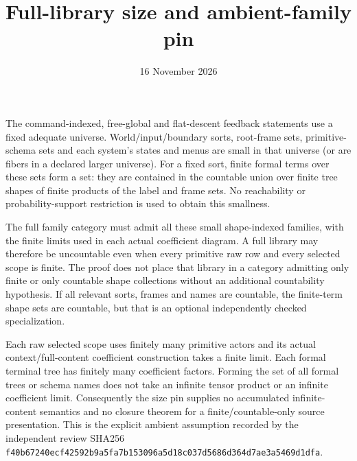 \documentclass{article}\usepackage{amsmath,amssymb}
\title{Full-library size and ambient-family pin}\date{16 November 2026}
\begin{document}
\maketitle
The command-indexed, free-global and flat-descent feedback statements use a fixed adequate universe. World/input/boundary sorts, root-frame sets, primitive-schema sets and each system's states and menus are small in that universe (or are fibers in a declared larger universe). For a fixed sort, finite formal terms over these sets form a set: they are contained in the countable union over finite tree shapes of finite products of the label and frame sets. No reachability or probability-support restriction is used to obtain this smallness.

The full family category must admit all these small shape-indexed families, with the finite limits used in each actual coefficient diagram. A full library may therefore be uncountable even when every primitive raw row and every selected scope is finite. The proof does not place that library in a category admitting only finite or only countable shape collections without an additional countability hypothesis. If all relevant sorts, frames and names are countable, the finite-term shape sets are countable, but that is an optional independently checked specialization.

Each raw selected scope uses finitely many primitive actors and its actual context/full-content coefficient construction takes a finite limit. Each formal terminal tree has finitely many coefficient factors. Forming the set of all formal trees or schema names does not take an infinite tensor product or an infinite coefficient limit. Consequently the size pin supplies no accumulated infinite-content semantics and no closure theorem for a finite/countable-only source presentation. This is the explicit ambient assumption recorded by the independent review SHA256 \texttt{f40b67240ecf42592b9a5fa7b153096a5d18c037d5686d364d7ae3a5469d1dfa}.
\end{document}
